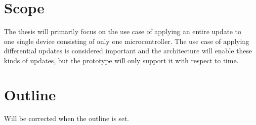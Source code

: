 \documentclass[0-thesis.tex]{subfiles}
\begin{document}
\section{Scope}
The thesis will primarily focus on the use case of applying an entire update to one single
device consisting of only one microcontroller. The use case of applying differential
updates is considered important and the architecture will enable these kinds of updates,
but the prototype will only support it with respect to time. 

\section{Outline}
Will be corrected when the outline is set.
\end{document}
